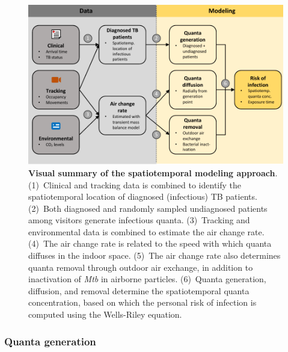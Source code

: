 \documentclass[fleqn,11pt]{wlscirep}
\begin{document}
\begin{figure}[!htpb]
    \centering
    \includegraphics{doc/model-flow-chart.pdf}
    \caption{\textbf{Visual summary of the spatiotemporal modeling approach}. (1)~Clinical and tracking data is combined to identify the spatiotemporal location of diagnosed (infectious) TB patients. (2)~Both diagnosed and randomly sampled undiagnosed  patients among visitors generate infectious quanta. (3)~Tracking and environmental data is combined to estimate the air change rate. (4)~The air change rate is related to the speed with which quanta diffuses in the indoor space. (5)~The air change rate also determines quanta removal through outdoor air exchange, in addition to inactivation of \emph{Mtb} in airborne particles. (6)~Quanta generation, diffusion, and removal determine the spatiotemporal quanta concentration, based on which the personal risk of infection is computed using the Wells-Riley equation.}
    \label{fig:modeling-flow}
\end{figure}

\subsubsection*{Quanta generation}
\end{document}
